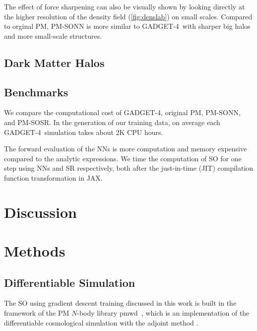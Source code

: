 \documentclass[modern, trackchanges, dvipsnames]{aastex631}
\newcommand{\pmwd}{{\usefont{T1}{nova}{m}{sl}pmwd}}
\newcommand{\GADGET}{{{\fontsize{10pt}{12pt}\selectfont GADGET}-4}}
\begin{document}
The effect of force sharpening can also be visually shown by looking
directly at the higher resolution of the density field
(\autoref{fig:denslab}) on small scales.
Compared to orginal PM, PM-SONN is more similar to \GADGET\ with sharper
big halos and more small-scale structures.


\subsection{Dark Matter Halos}



\subsection{Benchmarks}
We compare the computational cost of \GADGET, original PM, PM-SONN, and
PM-SOSR.
In the generation of our training data, on average each \GADGET\
simulation takes about 2K CPU hours.


The forward evaluation of the NNs is more computation and memory
expensive compared to the analytic expressions.
We time the computation of SO for one step using NNs and SR
respectively, both after the just-in-time (JIT) compilation function
transformation in JAX.


\vspace{1em}
\section{Discussion}


\vspace{1em}
\section{Methods}


\vspace{1em}
\subsection{Differentiable Simulation}
\label{sec:pmwd}

The SO using gradient descent training discussed in this work is built
in the framework of the PM $N$-body library \pmwd\ \citep{Li2022b},
which is an implementation of the differentiable cosmological simulation
with the adjoint method \citep{Li2022a}.
\end{document}
